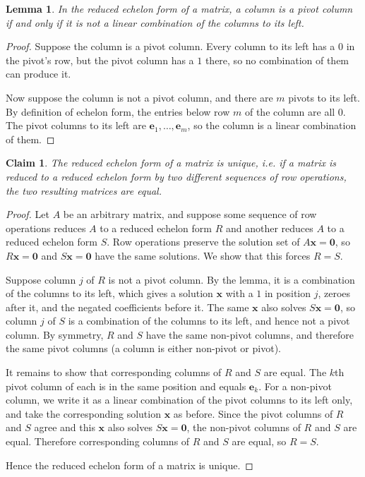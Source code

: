 \documentclass{article}
\newtheorem*{claim}{Claim}
\newtheorem*{lemma}{Lemma}
\begin{document}
\begin{lemma}
    In the reduced echelon form of a matrix, a column is a pivot column if and only if it is not a linear 
    combination of the columns to its left.
\end{lemma}

\begin{proof}
    Suppose the column is a pivot column. Every column to its left has a $0$ in the pivot's row, but the pivot 
    column has a $1$ there, so no combination of them can produce it.

    \medskip

    Now suppose the column is not a pivot column, and there are $m$ pivots to its left. By definition of 
    echelon form, the entries below row $m$ of the column are all $0$. The pivot columns to its left are 
    $\mathbf{e}_1, \dots, \mathbf{e}_m$, so the column is a linear combination of them.
\end{proof}

\begin{claim}
    The reduced echelon form of a matrix is unique, i.e. if a matrix is reduced to a reduced echelon form 
    by two different sequences of row operations, the two resulting matrices are equal.
\end{claim}

\begin{proof}
    Let $A$ be an arbitrary matrix, and suppose some sequence of row operations reduces $A$ to a reduced 
    echelon form $R$ and another reduces $A$ to a reduced echelon form $S$. Row operations preserve the 
    solution set of $A\mathbf{x} = \mathbf{0}$, so $R\mathbf{x} = \mathbf{0}$ and $S\mathbf{x} = \mathbf{0}$ 
    have the same solutions. We show that this forces $R = S$.

    \medskip

    Suppose column $j$ of $R$ is not a pivot column. By the lemma, it is a combination of the columns to its 
    left, which gives a solution $\mathbf{x}$ with a $1$ in position $j$, zeroes after it, and the negated 
    coefficients before it. The same $\mathbf{x}$ also solves $S\mathbf{x} = \mathbf{0}$, so column $j$ of $S$ 
    is a combination of the columns to its left, and hence not a pivot column. By symmetry, $R$ and $S$ have 
    the same non-pivot columns, and therefore the same pivot columns (a column is either non-pivot or pivot).

    \medskip

    It remains to show that corresponding columns of $R$ and $S$ are equal. The $k$th pivot column of each is 
    in the same position and equals $\mathbf{e}_k$. For a non-pivot column, we write it as a linear 
    combination of the pivot columns to its left only, and take the corresponding solution $\mathbf{x}$ as 
    before. Since the pivot columns of $R$ and $S$ agree and this $\mathbf{x}$ also solves 
    $S\mathbf{x} = \mathbf{0}$, the non-pivot columns of $R$ and $S$ are equal. Therefore corresponding columns 
    of $R$ and $S$ are equal, so $R = S$.

    \medskip

    Hence the reduced echelon form of a matrix is unique.
\end{proof}
\end{document}

